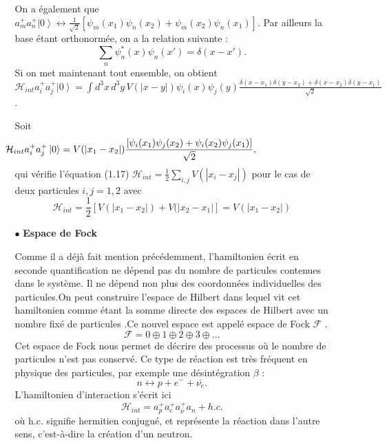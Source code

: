 \documentclass[12pt,a4paper, openany]{report}
\begin{document}
\begin{flushleft}
\begin{itemize}
\begin{flushleft}
\begin{itemize}
On a également que   	\hspace{0.2cm}$a^{+}_ma^{+}_n\left|0\right\rangle\leftrightarrow{\frac{1}{\sqrt{2}}[
	{\psi}_m(x_1){\psi}_n(x_2)+{\psi}_m(x_2){\psi}_n(x_1)]} $. Par ailleurs la base étant orthonormée, on a la relation suivante :
\begin{equation}
	\sum_{n}\psi^{*}_n(x)\psi_n(x')=\delta(x-x').
\end{equation}
Si on met maintenant tout ensemble, on obtient \\ $\mathcal{H}_{int}a_i^{+}a_j^{+}\left|0\right\rangle=\int d^{3}x\,d^{3}y\,V(\left|x-y\right|)\psi_i(x)\psi_j(y)\frac{\delta(x-x_1)\delta(y-x_2)+\delta(x-x_2)\delta(y-x_1)}{\sqrt{2}}$.\\

\par Soit 
\begin{equation}
	\hspace{-3cm}	\mathcal{H}_{int}a_i^{+}a_j^{+}\left|0\right\rangle= V(\left|x_1-x_2\right|)\frac{\left[{\psi}_i(x_1){\psi}_j(x_2)+{\psi}_i(x_2){\psi}_j(x_1)\right]}{\sqrt{2}} ,
\end{equation}
qui vérifie l'équation (1.17) \hspace{0.2cm}$\mathcal{H}_{int}=\frac{1}{2}\sum_{i,j}V(\left|x_i-x_j\right|)$ pour le cas de deux particules $ i,j=1,2$  avec 
\begin{equation}
	\mathcal{H}_{int}=\frac{1}{2}[V(\left|x_1-x_2\right|)+V(\left|x_2-x_1\right|]=V(\left|x_1-x_2\right|)
\end{equation}
\item[$\bullet$] \textbf{Espace de Fock} \par Comme il a déjà fait mention précédemment, l'hamiltonien écrit en seconde quantification ne dépend pas du nombre de particules contenues dans le système. Il ne dépend non plus des coordonnées individuelles des particules.On peut construire l'espace de Hilbert dans lequel vit cet hamiltonien comme étant la somme directe des espaces de Hilbert avec un nombre fixé de particules .Ce nouvel espace est appelé espace de Fock $\mathcal{F}$ .
\begin{equation}
	\mathcal{F}=0\oplus 1 \oplus 2 \oplus 3 \oplus...
\end{equation}
Cet espace de Fock nous permet de décrire des processus où le nombre de particules n'est pas conservé. Ce type de réaction est très fréquent en physique des particules, par exemple une désintégration $\beta$ :
\begin{equation}
	n\leftrightarrow p +e^{-}+\bar{\nu_{e}}.
\end{equation}
L'hamiltonien d'interaction s'écrit ici 
$$ \mathcal{H}_{int}= a^{+}_pa^{+}_e a^{+}_{\bar{\nu}} a_n +h.c.$$ 
où h.c. signifie hermitien conjugué, et représente la réaction dans l'autre sens, c'est-à-dire la création d'un neutron.


\end{itemize}
\end{flushleft}
\end{itemize}
\end{flushleft}
\end{document}
